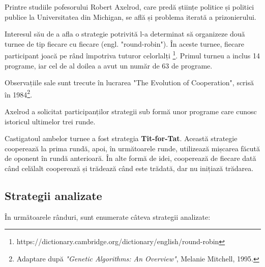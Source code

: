 Printre studiile pofesorului Robert Axelrod, care predă științe politice și politici publice la Universitatea din Michigan, se află și problema iterată a prizonierului.

Interesul său de a afla o strategie potrivită l-a determinat să organizeze două turnee de tip fiecare cu fiecare (engl. "round-robin"). În aceste turnee, fiecare participant joacă pe rând împotriva tuturor celorlalți \footnote{https://dictionary.cambridge.org/dictionary/english/round-robin}.  Primul turneu a inclus 14 programe, iar cel de al doilea a avut un număr de 63 de programe.

Observațiile sale sunt trecute în lucrarea "The Evolution of Cooperation", scrisă în 1984\footnote{Adaptare după \textit{"Genetic Algorithms: An Overview"}, Melanie Mitchell, 1995.}.

Axelrod a solicitat participanților strategii sub formă unor programe care cunosc istoricul ultimelor trei runde.

Castigatoul ambelor turnee a fost strategia \textbf{Tit-for-Tat}. Această strategie cooperează la prima rundă, apoi, în următoarele runde, utilizează mișcarea făcută de oponent în rundă anterioară. În alte formă de idei, cooperează de fiecare dată când celălalt cooperează și trădează când este trădată, dar nu inițiază trădarea.

\subsection{Strategii analizate}

În următoarele rânduri, sunt enumerate câteva strategii analizate:

